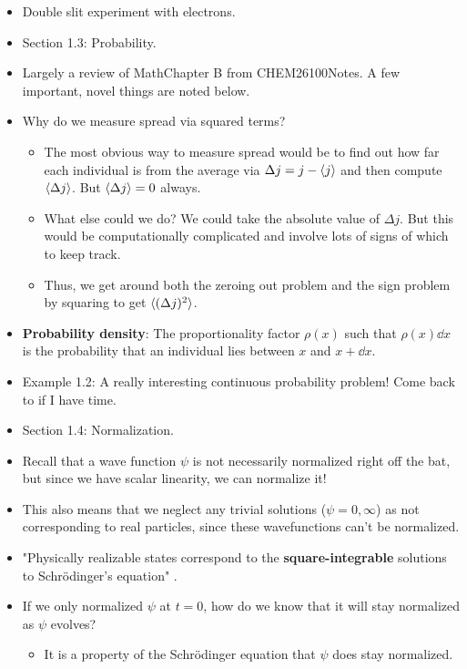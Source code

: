 \documentclass[../notes.tex]{subfiles}
\begin{document}
\begin{itemize}
\begin{itemize}
    \end{itemize}
    \item Double slit experiment with electrons.
    \item Section 1.3: Probability.
    \item Largely a review of MathChapter B from CHEM26100Notes. A few important, novel things are noted below.
    \item Why do we measure spread via squared terms?
    \begin{itemize}
        \item The most obvious way to measure spread would be to find out how far each individual is from the average via $\Delta j=j-\langle{j}\rangle$ and then compute $\langle{\Delta j}\rangle$. But $\langle{\Delta j}\rangle=0$ always.
        \item What else could we do? We could take the absolute value of $\Delta j$. But this would be computationally complicated and involve lots of signs of which to keep track.
        \item Thus, we get around both the zeroing out problem and the sign problem by squaring to get $\langle{(\Delta j)^2}\rangle$.
    \end{itemize}
    \item \textbf{Probability density}: The proportionality factor $\rho(x)$ such that $\rho(x)\dd{x}$ is the probability that an individual lies between $x$ and $x+\dd{x}$.
    \item Example 1.2: A really interesting continuous probability problem! Come back to if I have time.
    \item Section 1.4: Normalization.
    \item Recall that a wave function $\psi$ is not necessarily normalized right off the bat, but since we have scalar linearity, we can normalize it!
    \item This also means that we neglect any trivial solutions ($\psi=0,\infty$) as not corresponding to real particles, since these wavefunctions can't be normalized.
    \item "Physically realizable states correspond to the \textbf{square-integrable} solutions to Schr\"{o}dinger's equation" \parencite[29]{bib:Griffiths}.
    \item If we only normalized $\psi$ at $t=0$, how do we know that it will stay normalized as $\psi$ evolves?
    \begin{itemize}
        \item It is a property of the Schr\"{o}dinger equation that $\psi$ does stay normalized.

\end{itemize}
\end{itemize}
\end{document}
